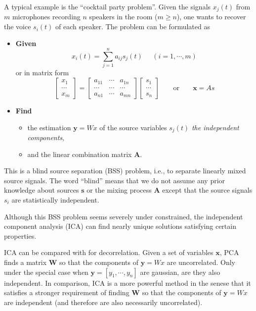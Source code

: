\documentclass[12pt, a4paper, onecolumn]{IEEEtran}
\begin{document}
A typical example is the ``cocktail party problem''. Given
the signals $x_j(t)$ from $m$ microphones recording $n$ speakers in the
room ($m\ge n$), one wants to recover the voice $s_i(t)$ of each speaker.
The problem can be formulated as
\begin{itemize}
\item {\bf Given}
\[	x_i(t)=\sum_{j=1}^n a_{ij} s_j(t)\;\;\;\;\;(i=1,\cdots,m) \]
or in matrix form
\[	\left[ \begin{array}{c} x_1 \\ \cdots \\ x_m \end{array} \right]=
	\left[ \begin{array}{ccc} a_{11} & \cdots & a_{1n} \\
	\cdots & \cdots & \cdots \\ a_{n1} & \cdots & a_{mn}
\end{array} \right]
\left[ \begin{array}{c} s_1 \\ \cdots \\ s_n \end{array} \right]
\;\;\;\;\;\;\;\mbox{or}\;\;\;\;\;\;\;	{\mathbf x=As}	\]
\item {\bf Find}
\begin{itemize}
\item the estimation ${\mathbf y=Wx}$ of the source variables $s_j(t)$
	{\em the independent components},
\item and the linear combination matrix ${\mathbf A}$.
\end{itemize}
\end{itemize}
This is a blind source separation (BSS) problem, i.e., to separate
linearly mixed source signals. The word ``blind'' means that we do
not assume any prior knowledge about sources ${\mathbf s}$ or the mixing
process ${\mathbf A}$ except that the source signals $s_i$ are statistically
independent.

Although this BSS problem seems severely under constrained, the independent
component analysis (ICA) can find nearly unique solutions satisfying
certain properties.

ICA can be compared with
for decorrelation.  Given a set of variables ${\mathbf x}$, PCA finds a
matrix ${\mathbf W}$ so that the components of ${\mathbf y=Wx}$ are
uncorrelated. Only under the special case when ${\mathbf y}=[y_1,\cdots,y_n]$
are gaussian, are they also independent. In comparison, ICA is a more powerful
method in the senese that it satisfies a stronger requirement of finding
${\mathbf W}$ so that the components of ${\mathbf y=Wx}$ are independent
(and therefore are also necessarily uncorrelated).
\end{document}
